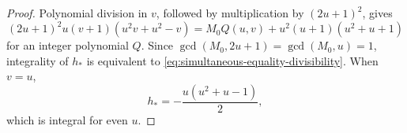 \begin{proof}
Polynomial division in \(v\), followed by multiplication by \((2u+1)^2\),
gives
\[
 (2u+1)^2u(v+1)(u^2v+u^2-v)
 =M_0Q(u,v)+u^2(u+1)(u^2+u+1)
\]
for an integer polynomial \(Q\).  Since
\(\gcd(M_0,2u+1)=\gcd(M_0,u)=1\), integrality of \(h_*\) is equivalent to
\eqref{eq:simultaneous-equality-divisibility}.  When \(v=u\),
\[
 h_*=-\frac{u(u^2+u-1)}2,
\]
which is integral for even \(u\).
\end{proof}

